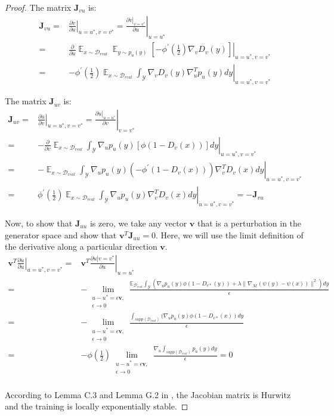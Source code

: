 \documentclass[10pt,twocolumn,letterpaper]{article}
\newcommand{\vb}{\mathbf{v}}
\newcommand{\di}{{D_v}}
\newcommand{\D}{\mathcal{D}}
\newcommand{\E}{\mathbb{E}}
\newcommand{\M}{\mathcal{M}}
\newcommand{\J}{\mathbf{J}}
\begin{document}
\begin{proof}
	The matrix $\J_{vu}$ is:
	\begin{align}
	\J_{vu} =& \left.\frac{\partial \dot{v}}{\partial u}\right|_{u=u^\ast,v=v^\ast}=\left.\frac{\left.\partial \dot{v}\right|_{v=v^\ast}}{\partial u}\right|_{u=u^\ast} \\
	=& \frac{\partial}{\partial u}\mathop{\E}_{x\sim \D_{real}}\left.\mathop{\E}_{y\sim p_u(y)}[-\phi^\prime (\frac{1}{2})\nabla_v\di(y)]\right|_{u=u^\ast,v=v^\ast}\\
	=&\left. -\phi^\prime (\frac{1}{2})\mathop{\E}_{x\sim \D_{real}}\int_{\mathcal{Y}}\nabla_v\di(y)\nabla_u^Tp_u(y)dy\right|_{u=u^\ast,v=v^\ast}
	\end{align}
	
	The matrix 	$\J_{uv}$ is:
	\begin{align}
	\J_{uv}=& \left.\frac{\partial \dot{u}}{\partial v}\right|_{u=u^\ast,v=v^\ast}=\left.\frac{\left.\partial \dot{u}\right|_{u=u^\ast}}{\partial v}\right|_{v=v^\ast} \\
	=&- \frac{\partial}{\partial v}\mathop{\E}_{x\sim \D_{real}}\left.\int_{\mathcal{Y}}\nabla_up_u(y)[\phi(1-\di(x))]dy\right|_{u=u^\ast,v=v^\ast}\\
	=&- \mathop{\E}_{x\sim \D_{real}}\left.\int_{\mathcal{Y}}\nabla_up_u(y)(-\phi^\prime(1-\di(x)))\nabla_v^T\di(x)dy\right|_{u=u^\ast,v=v^\ast}\\
	=& \left. \phi^\prime (\frac{1}{2})\mathop{\E}_{x\sim \D_{real}}\int_{\mathcal{Y}}\nabla_up_u(y)\nabla_v^T\di(x)dy\right|_{u=u^\ast,v=v^\ast} =-\J_{vu}
	\end{align}
	
	Now, to show that $\J_{uu}$ is zero, we take any vector $\vb$ that is a perturbation in the generator space
	and show that $\vb^T\J_{uu}=0$. Here, we will use the limit definition of the derivative along a particular
	direction $\vb$.
	\begin{align}
	\left.\vb^T\frac{\partial \dot{u}}{\partial u}\right|_{u=u^\ast,v=v^\ast} =&\left.\vb^T\frac{\left. \partial \dot{u}\right|{v=v^\ast}}{\partial u}\right|_{u=u^\ast}\\
	=&-\lim\limits_{\substack{u-u^\ast=\epsilon\vb,\\\epsilon\rightarrow 0} } \frac{\E_{\D_{real}}\int_{\mathcal{Y}}(\nabla_u p_u(y) \phi(1-D_{v\ast}(y))+\lambda \|\nabla_\M (\psi(y)-\psi(x))\|^2)dy}{\epsilon}\\
	=& -\lim\limits_{\substack{u-u^\ast=\epsilon\vb,\\\epsilon\rightarrow 0} } \frac{\int_{supp(\D_{real})}(\nabla_u p_u(y) \phi(1-D_{v\ast}(x))dy}{\epsilon}\\
	=&-\phi(\frac{1}{2})\lim\limits_{\substack{u-u^\ast=\epsilon\vb,\\\epsilon\rightarrow 0} } \frac{\nabla_u\int_{supp(\D_{real})} p_u(y) dy}{\epsilon} =0\\
	\end{align}
	
	According to Lemma C.3 and Lemma G.2 in \cite{arora2017generalization}, the Jacobian matrix is Hurwitz and the training is locally exponentially stable.
\end{proof}
\end{document}
